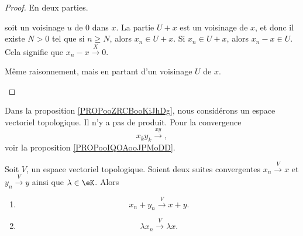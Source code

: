 \begin{proof}
	En deux parties.
	\begin{subproof}
		\spitem[\( \Rightarrow\)]
		soit un voisinage \( u\) de \( 0\) dans \( x\). La partie \( U+x\) est un voisinage de \( x\), et donc il existe \( N>0\) tel que si \( n\geq N\), alors \( x_n\in U+x\). Si \( x_n\in U+x\), alors \( x_n-x\in U\). Cela signifie que \( x_n-x\stackrel{ X}{\longrightarrow} 0\).

		\spitem[\( \Leftarrow\)]
		Même raisonnement, mais en partant d'un voisinage \( U\) de \( x\).
	\end{subproof}
\end{proof}


\begin{normaltext}
	Dans la proposition \ref{PROPooZRCBooKiJhDg}, nous considérons un espace vectoriel topologique. Il n'y a pas de produit. Pour la convergence
	\begin{equation}
		x_ky_k\stackrel{ xy}{\longrightarrow},
	\end{equation}
	voir la proposition \ref{PROPooIQOAooJPMoDD}.
\end{normaltext}

\begin{proposition}        \label{PROPooZRCBooKiJhDg}
	Soit \( V\), un espace vectoriel topologique. Soient deux suites convergentes \( x_n\stackrel{V}{\longrightarrow}x\) et \( y_n\stackrel{V}{\longrightarrow}y\) ainsi que \( \lambda\in \eK\). Alors
	\begin{enumerate}
		\item       \label{ITEMooSHPAooQyEkgT}
		      \begin{equation}
			      x_n+y_n\stackrel{V}{\longrightarrow}x+y.
		      \end{equation}
		\item   \label{ITEMooYHHYooYATzWE}
		      \begin{equation}
			      \lambda x_n\stackrel{V}{\longrightarrow}\lambda x.
		      \end{equation}
	\end{enumerate}
\end{proposition}

